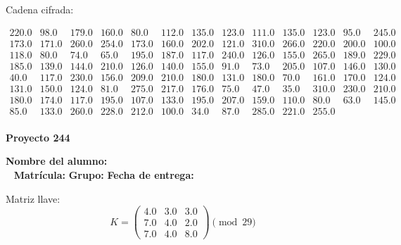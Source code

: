 \documentclass[12pt]{article}
\begin{document}
Cadena cifrada:
\begin{center}
$\begin{array}{lllllllllllll}
220.0 & 98.0 & 179.0 & 160.0 & 80.0 & 112.0 & 135.0 & 123.0 & 111.0 & 135.0 & 123.0 & 95.0 & 245.0\\
173.0 & 171.0 & 260.0 & 254.0 & 173.0 & 160.0 & 202.0 & 121.0 & 310.0 & 266.0 & 220.0 & 200.0 & 100.0\\
118.0 & 80.0 & 74.0 & 65.0 & 195.0 & 187.0 & 117.0 & 240.0 & 126.0 & 155.0 & 265.0 & 189.0 & 229.0\\
185.0 & 139.0 & 144.0 & 210.0 & 126.0 & 140.0 & 155.0 & 91.0 & 73.0 & 205.0 & 107.0 & 146.0 & 130.0\\
40.0 & 117.0 & 230.0 & 156.0 & 209.0 & 210.0 & 180.0 & 131.0 & 180.0 & 70.0 & 161.0 & 170.0 & 124.0\\
131.0 & 150.0 & 124.0 & 81.0 & 275.0 & 217.0 & 176.0 & 75.0 & 47.0 & 35.0 & 310.0 & 230.0 & 210.0\\
180.0 & 174.0 & 117.0 & 195.0 & 107.0 & 133.0 & 195.0 & 207.0 & 159.0 & 110.0 & 80.0 & 63.0 & 145.0\\
85.0 & 133.0 & 260.0 & 228.0 & 212.0 & 100.0 & 34.0 & 87.0 & 285.0 & 221.0 & 255.0\\
\end{array}$
\end{center}

\newpage


\textbf{Proyecto 244}

\textbf{Nombre del alumno:} \underline{\hspace{13cm}}\\\
\vspace{1cm}
\textbf{Matrícula:} \underline{\hspace{4cm}} \hspace{1cm}
\textbf{Grupo:} \underline{\hspace{2cm}}
\textbf{Fecha de entrega:} \underline{\hspace{2cm}}

\medskip

Matriz llave:
\[
K = \begin{pmatrix}
4.0 & 3.0 & 3.0\\
7.0 & 4.0 & 2.0\\
7.0 & 4.0 & 8.0
\end{pmatrix} \pmod{29}
\]
\end{document}
